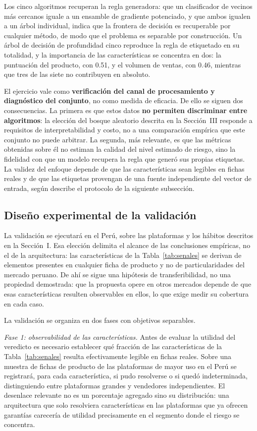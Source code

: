 Los cinco algoritmos recuperan la regla generadora: que un clasificador de vecinos más
cercanos iguale a un ensamble de gradiente potenciado, y que ambos igualen a un árbol
individual, indica que la frontera de decisión es recuperable por cualquier método, de modo
que el problema es separable por construcción. Un árbol de decisión de profundidad cinco
reproduce la regla de etiquetado en su totalidad, y la importancia de las características se
concentra en dos: la puntuación del producto, con 0.51, y el volumen de ventas, con 0.46,
mientras que tres de las siete no contribuyen en absoluto.

El ejercicio vale como \textbf{verificación del canal de procesamiento y diagnóstico del
conjunto}, no como medida de eficacia. De ello se siguen dos consecuencias. La primera es que
estos datos \textbf{no permiten discriminar entre algoritmos}: la elección del bosque
aleatorio descrita en la Sección~III responde a requisitos de interpretabilidad y costo, no a
una comparación empírica que este conjunto no puede arbitrar. La segunda, más relevante, es
que las métricas obtenidas sobre él no estiman la calidad del nivel estimado de riesgo, sino
la fidelidad con que un modelo recupera la regla que generó sus propias etiquetas. La validez
del enfoque depende de que las características sean legibles en fichas reales y de que las
etiquetas provengan de una fuente independiente del vector de entrada, según describe el
protocolo de la siguiente subsección.


\subsection{Diseño experimental de la validación}

La validación se ejecutará en el Perú, sobre las plataformas y los hábitos descritos en la
Sección~I. Esa elección delimita el alcance de las conclusiones empíricas, no el de la
arquitectura: las características de la Tabla~\ref{tab:senales} se derivan de elementos
presentes en cualquier ficha de producto y no de particularidades del mercado peruano. De ahí
se sigue una hipótesis de transferibilidad, no una propiedad demostrada: que la propuesta
opere en otros mercados depende de que esas características resulten observables en ellos, lo
que exige medir su cobertura en cada caso.

La validación se organiza en dos fases con objetivos separables.

\emph{Fase 1: observabilidad de las características.} Antes de evaluar la utilidad del
veredicto es necesario establecer qué fracción de las características de la
Tabla~\ref{tab:senales} resulta efectivamente legible en fichas reales. Sobre una muestra de
fichas de producto de las plataformas de mayor uso en el Perú se registrará, para cada
característica, si pudo resolverse o si quedó indeterminada, distinguiendo entre plataformas
grandes y vendedores independientes. El desenlace relevante no es un porcentaje agregado sino
su distribución: una arquitectura que solo resolviera características en las plataformas que ya
ofrecen garantías carecería de utilidad precisamente en el segmento donde el riesgo se
concentra.

